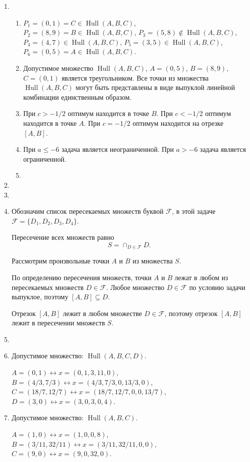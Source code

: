 \documentclass[12pt]{article}
\newcommand{\cF}{\mathcal{F}}
\DeclareMathOperator{\Hull}{Hull}
\DeclareMathOperator{\hull}{\Hull}
\begin{document}
\begin{enumerate}
  \item %
  \begin{enumerate}
    \item $P_1 = (0, 1) = C \in \hull(A, B, C)$, $P_2 = (8, 9) = B \in \hull(A, B, C)$, 
    $P_3 = (5, 8) \notin \hull(A, B, C)$, $P_4 = (4, 7) \in \hull(A, B, C)$,
    $P_5 = (3, 5) \in \hull(A, B, C)$, $P_6 = (0, 5) = A  \in \hull(A, B, C)$. 
    \item Допустимое множество $\hull(A, B, C)$, $A = (0, 5)$, $B = (8, 9)$, $C = (0, 1)$ является треугольником. 
    Все точки из множества $\hull(A, B, C)$ могут быть представлены в виде выпуклой линейной комбинации единственным образом. 
    \item При $c > -1/2$ оптимум находится в точке $B$. 
    При $c < -1/2$ оптимум находится в точке $A$. 
    При $c = -1/2$ оптимум находится на отрезке $[A, B]$.
    \item При $a \leq -6$ задача является неограниченной. 
    При $a > -6$ задача является ограниченной. 
    \item 
  \end{enumerate}

\item 
\item 

\item Обозначим список пересекаемых множеств буквой $\cF$, в этой задаче $\cF = \{D_1, D_2, D_3, D_4\}$.

Пересечение всех множеств равно 
\[
  S = \cap_{D \in \cF} D.
\] 

Рассмотрим произвольные точки $A$ и $B$ из множества $S$. 

По определению пересечения множеств, точки $A$ и $B$ лежат в любом из пересекаемых множеств $D \in \cF$. 
Любое множество $D \in \cF$ по условию задачи выпуклое, поэтому $[A, B] \subseteq D$.

Отрезок $[A, B]$ лежит в любом множестве $D \in \cF$, поэтому отрезок $[A, B]$ лежит в пересечении множеств $S$.

\item 

\item %
Допустимое множество: $\hull(A, B, C, D)$.

$A = (0, 1) \leftrightarrow x= (0, 1, 3, 11, 0)$, 
$B = (4/3, 7/3) \leftrightarrow x = (4/3, 7/3, 0, 13/3, 0)$, 
$C = (18/7, 12/7) \leftrightarrow x = (18/7, 12/7, 0, 0, 13/7)$, 
$D = (3, 0) \leftrightarrow x = (3, 0, 3, 0, 4)$.

\item %
Допустимое множество: $\hull(A, B, C)$.


$A = (1, 0) \leftrightarrow x = (1, 0, 0, 8)$, 
$B = (3/ 11, 32/11) \leftrightarrow x = (3/11, 32/11, 0, 0)$, 
$C = (9, 0) \leftrightarrow x = (9, 0, 32, 0)$.

\end{enumerate}
\end{document}
